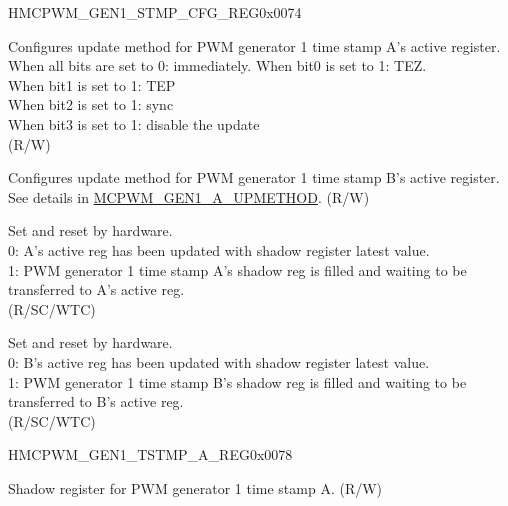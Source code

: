 \begin{register}{H}{MCPWM\_GEN1\_STMP\_CFG\_REG}{0x0074}\label{regdesc:MCPWMGEN1STMPCFGREG}
%
%
%
%
%
\regnewline%
\begin{regdesc}\begin{reglist}
\label{fielddesc:MCPWMGEN1AUPMETHOD}\item [MCPWM\_GEN1\_A\_UPMETHOD] Configures update method for PWM generator 1 time stamp A's active register. 
\\When all bits are set to 0: immediately. When bit0 is set to 1: TEZ. 
\\When bit1 is set to 1: TEP 
\\When bit2 is set to 1: sync 
\\When bit3 is set to 1: disable the update
\\(R/W)
\label{fielddesc:MCPWMGEN1BUPMETHOD}\item [MCPWM\_GEN1\_B\_UPMETHOD] Configures update method for PWM generator 1 time stamp B's active register. See details in \hyperref[fielddesc:MCPWMGEN1AUPMETHOD]{MCPWM\_GEN1\_A\_UPMETHOD}. (R/W)
\label{fielddesc:MCPWMGEN1ASHDWFULL}\item [MCPWM\_GEN1\_A\_SHDW\_FULL] Set and reset by hardware. \\
0: A's active reg has been updated with shadow register latest value.\\
1: PWM generator 1 time stamp A's shadow reg is filled and waiting to be transferred to A's active reg. \\
(R/SC/WTC)
\label{fielddesc:MCPWMGEN1BSHDWFULL}\item [MCPWM\_GEN1\_B\_SHDW\_FULL] Set and reset by hardware. \\
0: B's active reg has been updated with shadow register latest value.\\
1: PWM generator 1 time stamp B's shadow reg is filled and waiting to be transferred to B's active reg. \\
(R/SC/WTC)
\end{reglist}\end{regdesc}
\end{register}


\begin{register}{H}{MCPWM\_GEN1\_TSTMP\_A\_REG}{0x0078}\label{regdesc:MCPWMGEN1TSTMPAREG}
%
%
\regnewline%
\begin{regdesc}\begin{reglist}
\label{fielddesc:MCPWMGEN1A}\item [MCPWM\_GEN1\_A] Shadow register for PWM generator 1 time stamp A.  (R/W)
\end{reglist}\end{regdesc}
\end{register}


